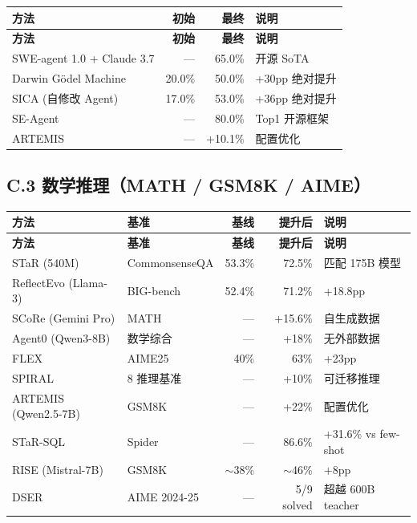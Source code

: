 \begin{longtable}{p{3.5cm}rrp{3.5cm}}
\toprule
\textbf{方法} & \textbf{初始} & \textbf{最终} & \textbf{说明} \\
\midrule
\endfirsthead
\toprule
\textbf{方法} & \textbf{初始} & \textbf{最终} & \textbf{说明} \\
\midrule
\endhead
\bottomrule
\endlastfoot

SWE-agent 1.0 + Claude 3.7 & — & 65.0\% & 开源 SoTA \\
Darwin G\"{o}del Machine & 20.0\% & 50.0\% & +30pp 绝对提升 \\
SICA (自修改 Agent) & 17.0\% & 53.0\% & +36pp 绝对提升 \\
SE-Agent & — & 80.0\% & Top1 开源框架 \\
ARTEMIS & — & +10.1\% & 配置优化 \\
\end{longtable}

\subsection*{C.3 数学推理（MATH / GSM8K / AIME）}

\begin{longtable}{p{3.2cm}p{2.2cm}rrp{2.8cm}}
\toprule
\textbf{方法} & \textbf{基准} & \textbf{基线} & \textbf{提升后} & \textbf{说明} \\
\midrule
\endfirsthead
\toprule
\textbf{方法} & \textbf{基准} & \textbf{基线} & \textbf{提升后} & \textbf{说明} \\
\midrule
\endhead
\bottomrule
\endlastfoot

STaR (540M) & CommonsenseQA & 53.3\% & 72.5\% & 匹配 175B 模型 \\
ReflectEvo (Llama-3) & BIG-bench & 52.4\% & 71.2\% & +18.8pp \\
SCoRe (Gemini Pro) & MATH & — & +15.6\% & 自生成数据 \\
Agent0 (Qwen3-8B) & 数学综合 & — & +18\% & 无外部数据 \\
FLEX & AIME25 & 40\% & 63\% & +23pp \\
SPIRAL & 8 推理基准 & — & +10\% & 可迁移推理 \\
ARTEMIS (Qwen2.5-7B) & GSM8K & — & +22\% & 配置优化 \\
STaR-SQL & Spider & — & 86.6\% & +31.6\% vs few-shot \\
RISE (Mistral-7B) & GSM8K & $\sim$38\% & $\sim$46\% & +8pp \\
DSER & AIME 2024-25 & — & 5/9 solved & 超越 600B teacher \\
\end{longtable}

